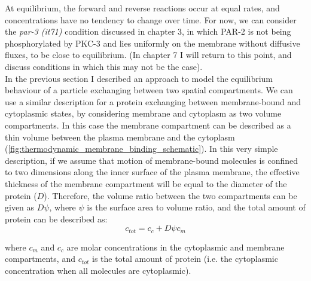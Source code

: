 \documentclass[12pt]{"report"}
\begin{document}
At equilibrium, the forward and reverse reactions occur at equal rates, and concentrations have no tendency to change over time. For now, we can consider the \textit{par-3 (it71)} condition discussed in chapter 3, in which PAR-2 is not being phosphorylated by PKC-3 and lies uniformly on the membrane without diffusive fluxes, to be close to equilibrium. (In chapter 7 I will return to this point, and discuss conditions in which this may not be the case). \\

In the previous section I described an approach to model the equilibrium behaviour of a particle exchanging between two spatial compartments. We can use a similar description for a protein exchanging between membrane-bound and cytoplasmic states, by considering membrane and cytoplasm as two volume compartments. In this case the membrane compartment can be described as a thin volume between the plasma membrane and the cytoplasm (\cref{fig:thermodynamic_membrane_binding_schematic}). In this very simple description, if we assume that motion of membrane-bound molecules is confined to two dimensions along the inner surface of the plasma membrane, the effective thickness of the membrane compartment will be equal to the diameter of the protein ($D$). Therefore, the volume ratio between the two compartments can be given as $D\psi$, where $\psi$ is the surface area to volume ratio, and the total amount of protein can be described as:
\begin{equation}
c_{tot} = c_c + D\psi c_m
\end{equation}

where $c_m$ and $c_c$ are molar concentrations in the cytoplasmic and membrane compartments, and $c_{tot}$ is the total amount of protein (i.e. the cytoplasmic concentration when all molecules are cytoplasmic).\\
\end{document}

